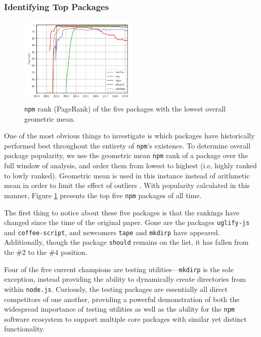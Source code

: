 \documentclass[10pt,conference]{IEEEtran}
\def\code#1{\texttt{#1}}
\begin{document}
\subsubsection{Identifying Top Packages}

\begin{figure}
  \includegraphics[width=0.5\textwidth]{figures/geo_mean_highest_pagerank.pdf}
  \caption{\code{npm} rank (PageRank) of the five packages with the lowest overall geometric mean.}
  \label{topFive}
\end{figure}

One of the most obvious things to investigate is which packages
have historically performed best throughout the entirety of 
\code{npm}'s existence. To determine overall package popularity,
we use the geometric mean \code{npm} rank of a package over the full 
window of analysis, and order them from lowest to highest (i.e,
highly ranked to lowly ranked). Geometric mean is used in this instance
instead of arithmetic mean in order to limit the effect of outliers \cite{Wittern:2016}.
With popularity calculated in this manner, Figure \ref{topFive} presents 
the top five \code{npm} packages of all time.

The first thing to notice about these five packages is that the rankings
have changed since the time of the original paper. Gone are the packages
\code{uglify-js} and \code{coffee-script}, and newcomers \code{tape} and \code{mkdirp}
have appeared. Additionally, though the package \code{should} remains on the list,
it has fallen from the \#2 to the \#4 position. 

Four of the five current champions are testing utilities---\code{mkdirp} is the sole exception, instead providing the ability to dynamically
create directories from within \code{node.js}. Curiously, the testing packages
are essentially all direct competitors of one another, providing a powerful 
demonstration of both the widespread importance of testing utilities as well as
the ability for the \code{npm} software ecosystem to support multiple core packages with
similar yet distinct functionality.
\end{document}
